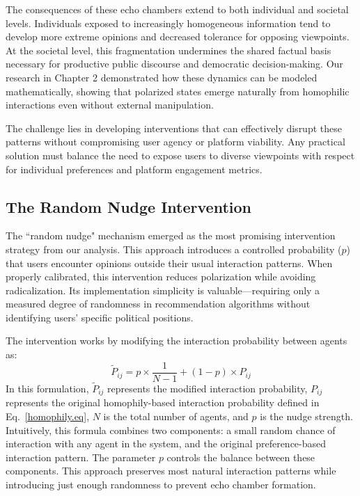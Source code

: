 The consequences of these echo chambers extend to both individual and societal levels. Individuals exposed to increasingly homogeneous information tend to develop more extreme opinions and decreased tolerance for opposing viewpoints. At the societal level, this fragmentation undermines the shared factual basis necessary for productive public discourse and democratic decision-making. Our research in Chapter 2 demonstrated how these dynamics can be modeled mathematically, showing that polarized states emerge naturally from homophilic interactions even without external manipulation.

The challenge lies in developing interventions that can effectively disrupt these patterns without compromising user agency or platform viability. Any practical solution must balance the need to expose users to diverse viewpoints with respect for individual preferences and platform engagement metrics.

\subsection{The Random Nudge Intervention}

The ``random nudge" mechanism emerged as the most promising intervention strategy from our analysis. This approach introduces a controlled probability ($p$) that users encounter opinions outside their usual interaction patterns. When properly calibrated, this intervention reduces polarization while avoiding radicalization. Its implementation simplicity is valuable—requiring only a measured degree of randomness in recommendation algorithms without identifying users' specific political positions.

The intervention works by modifying the interaction probability between agents as:
\begin{equation}
    \widetilde{P}_{ij} = p \times \frac{1}{N-1} + (1-p) \times P_{ij}
\end{equation}
In this formulation, $\widetilde{P}_{ij}$ represents the modified interaction probability, $P_{ij}$ represents the original homophily-based interaction probability defined in Eq.~\ref{homophily.eq}, $N$ is the total number of agents, and $p$ is the nudge strength. Intuitively, this formula combines two components: a small random chance of interaction with any agent in the system, and the original preference-based interaction pattern. The parameter $p$ controls the balance between these components. This approach preserves most natural interaction patterns while introducing just enough randomness to prevent echo chamber formation.

